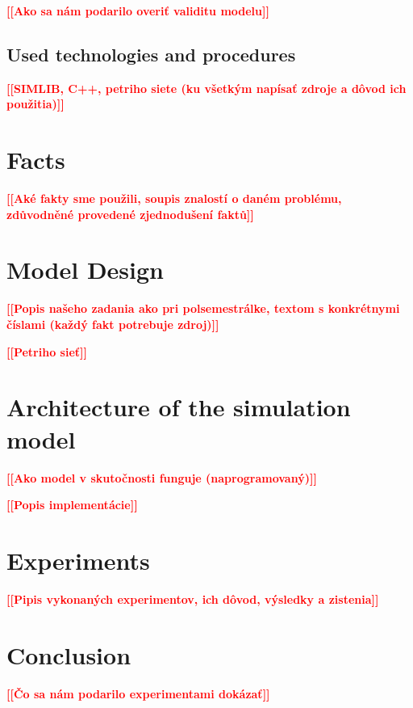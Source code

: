 \documentclass[a4paper, 11pt, a4paper]{article}
\newcommand{\todo}[1]{\textcolor{red}{\textbf{[[#1]]}}}
\begin{document}
\noindent\todo{Ako sa nám podarilo overiť validitu modelu}


\subsection{Used technologies and procedures}

\noindent\todo{SIMLIB, C++, petriho siete (ku všetkým napísať zdroje a dôvod ich použitia)}



\section{Facts}

\todo{Aké fakty sme použili, soupis znalostí o daném problému, zdůvodněné provedené zjednodušení faktů}


\section{Model Design}

\noindent\todo{Popis našeho zadania ako pri polsemestrálke, textom s konkrétnymi číslami (každý fakt potrebuje zdroj)}

\noindent\todo{Petriho sieť}


\section{Architecture of the simulation model}

\noindent\todo{Ako model v skutočnosti funguje (naprogramovaný)}

\noindent\todo{Popis implementácie}


\section{Experiments}

\todo{Pipis vykonaných experimentov, ich dôvod, výsledky a zistenia}


\section{Conclusion}

\todo{Čo sa nám podarilo experimentami dokázať}


\newpage


\renewcommand{\refname}{Sources}

\end{document}
